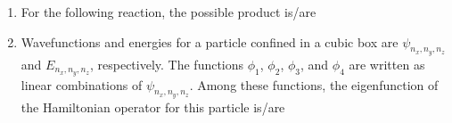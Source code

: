 \documentclass[journal,12pt,onecolumn]{IEEEtran}
\theoremstyle{remark}
\begin{document}
\begin{enumerate}
\item For the following reaction, the possible product is/are
    \begin{enumerate}
    \end{enumerate}      \hfill{}



\item Wavefunctions and energies for a particle confined in a cubic box are $\psi_{n_x, n_y, n_z}$ and $E_{n_x, n_y, n_z}$, respectively. The functions $\phi_1$, $\phi_2$, $\phi_3$, and $\phi_4$ are written as linear combinations of $\psi_{n_x, n_y, n_z}$. Among these functions, the eigenfunction of the Hamiltonian operator for this particle is/are


\end{enumerate}
\end{document}
